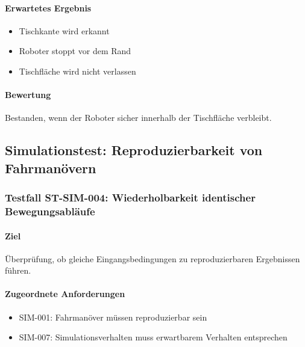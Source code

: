 \paragraph{Erwartetes Ergebnis}\label{erwartetes-ergebnis-18}

\begin{itemize}
\tightlist
\item
  Tischkante wird erkannt
\item
  Roboter stoppt vor dem Rand
\item
  Tischfläche wird nicht verlassen
\end{itemize}

\paragraph{Bewertung}\label{bewertung-18}

Bestanden, wenn der Roboter sicher innerhalb der Tischfläche verbleibt.

\subsection{Simulationstest: Reproduzierbarkeit von
Fahrmanövern}\label{simulationstest-reproduzierbarkeit-von-fahrmanuxf6vern}

\subsubsection{Testfall ST-SIM-004: Wiederholbarkeit identischer
Bewegungsabläufe}\label{testfall-st-sim-004-wiederholbarkeit-identischer-bewegungsabluxe4ufe}

\paragraph{Ziel}\label{ziel-19}

Überprüfung, ob gleiche Eingangsbedingungen zu reproduzierbaren
Ergebnissen führen.

\paragraph{Zugeordnete
Anforderungen}\label{zugeordnete-anforderungen-19}

\begin{itemize}
\tightlist
\item
  SIM-001: Fahrmanöver müssen reproduzierbar sein
\item
  SIM-007: Simulationsverhalten muss erwartbarem Verhalten entsprechen
\end{itemize}

